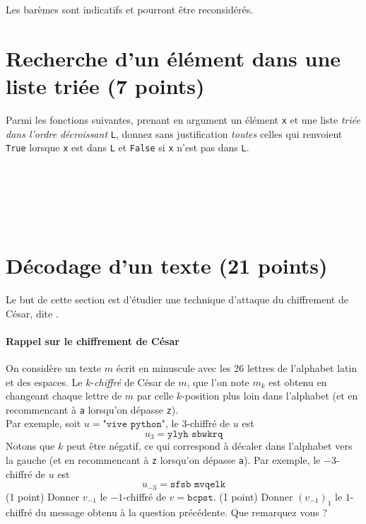 
Les barèmes sont indicatifs et pourront être reconsidérés.

\section*{Recherche d'un élément dans une liste triée (7 points)}

\ques Parmi les fonctions suivantes, prenant en argument un élément \texttt{x} et une liste \emph{triée dans l'ordre décroissant} \texttt{L}, donnez sans justification \emph{toutes} celles qui renvoient \texttt{True} lorsque \texttt{x} est dans \texttt{L} et \texttt{False} si \texttt{x} n'est pas dans \texttt{L}.

\begin{multicols}{3}
    \inputminted{python}{minted/exams/find1.py}
    \inputminted{python}{minted/exams/find2.py}
    \columnbreak
    \inputminted{python}{minted/exams/find3.py}
    \inputminted{python}{minted/exams/find4.py}
    \columnbreak
    \inputminted{python}{minted/exams/find5.py}
    \inputminted{python}{minted/exams/find6.py}
    \inputminted{python}{minted/exams/find7.py}
\end{multicols}

\section*{Décodage d'un texte (21 points)}

Le but de cette section est d'étudier une technique d'attaque du chiffrement de César, dite . 

\paragraph*{Rappel sur le chiffrement de César} On considère un texte $ m $ écrit en minuscule avec les 26 lettres de l'alphabet latin et des espaces. Le $ k $-\emph{chiffré} de César de $ m $, que l'on note $ m_k $ est obtenu en changeant chaque lettre de $ m $ par celle $ k $-position plus loin dans l'alphabet (et en recommencant à \texttt{a} lorsqu'on dépasse \texttt{z}).\\
Par exemple, soit $ u = \texttt{"vive python"}$, le $ 3 $-chiffré de $ u $ est \[
    u_3 = \texttt{ylyh sbwkrq}
\]
Notons que $ k $ peut être négatif, ce qui correspond à décaler dans l'alphabet vers la gauche (et en recommencant à \texttt{z} lorsqu'on dépasse \texttt{a}). Par exemple, le $ -3 $-chiffré de $ u $ est \[
    u_{-3} = \texttt{sfsb mvqelk}
\]
\quessques (1 point) Donner $ v_{-1} $ le $ -1 $-chiffré de $ v = \texttt{bcpst} $.
\ssques (1 point) Donner $ (v_{-1})_1 $ le $ 1 $-chiffré du message obtenu à la question précédente. Que remarquez vous ?\\

